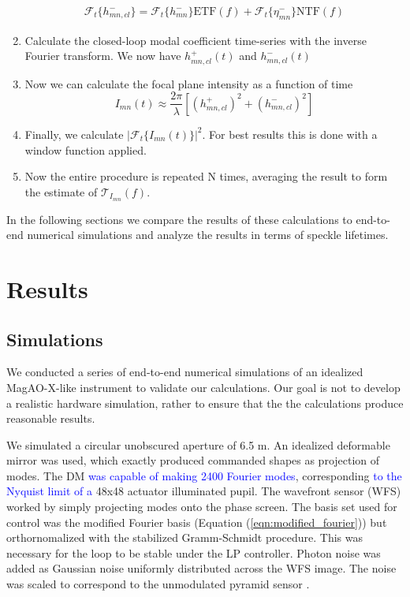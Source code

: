 \documentclass[10pt,preprint]{aastex631}
\newcommand{\jrmadd}[1]{\textcolor{blue}{#1}}
\begin{document}
\begin{enumerate}
\begin{eqnarray}
\mathcal{F}_t\{h_{mn,cl}^-\} = \mathcal{F}_t\{h_{mn}^-\} \mathrm{ETF}(f) + \mathcal{F}_t\{\eta_{mn}^-\} \mathrm{NTF}(f) \nonumber
\end{eqnarray}
\item Calculate the closed-loop modal coefficient time-series with the inverse Fourier transform.  We now have $h_{mn,cl}^+(t)$ and $h_{mn,cl}^-(t)$ 
\item Now we can calculate the focal plane intensity as a function of time
\begin{equation}
I_{mn}(t) \approx \frac{2\pi}{\lambda}\left[ \left(h_{mn,cl}^+\right)^2 + \left(h_{mn,cl}^-\right)^2 \right] 
\end{equation}
\item Finally, we calculate $|\mathcal{F}_t\{I_{mn}(t)\}|^2$.  For best results this is done with a window function applied.
\item Now the entire procedure is repeated N times, averaging the result to form the estimate of $\mathcal{T}_{I_{mn}}(f)$.
\end{enumerate}

In the following sections we compare the results of these calculations to end-to-end numerical simulations and analyze the results in terms of speckle lifetimes.

\afterpage{\clearpage}



\section{Results}



\subsection{Simulations}
\label{sect:simulations}
We conducted a series of end-to-end numerical simulations of an idealized MagAO-X-like instrument to validate our calculations.  Our goal is not to develop a realistic hardware simulation, rather to ensure that the the calculations produce reasonable results. 

We simulated a circular unobscured aperture of 6.5 m.   An idealized deformable mirror was used, which exactly produced commanded shapes as projection of modes.  The DM \jrmadd{was capable of making 2400 Fourier modes}, corresponding \jrmadd{to the Nyquist limit of a} 48x48 actuator illuminated pupil.  The wavefront sensor (WFS) worked by simply projecting modes onto the phase screen.  The basis set used for control was the modified Fourier basis (Equation (\ref{eqn:modified_fourier})) but orthornomalized with the stabilized Gramm-Schmidt procedure.  This was necessary for the loop to be stable under the LP controller.  Photon noise was added as Gaussian noise uniformly distributed across the WFS image.  The noise was scaled to correspond to the unmodulated pyramid sensor  \cite[$\beta_p = \sqrt{2}$,][]{2005ApJ...629..592G}.
\end{document}
